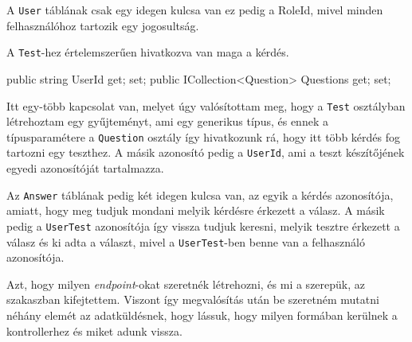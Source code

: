 A \texttt{User} táblának csak egy idegen kulcsa van ez pedig a RoleId, mivel minden felhasználóhoz tartozik egy jogosultság. \newline

A \texttt{Test}-hez értelemszerűen hivatkozva van maga a kérdés.
\begin{cpp}
public string UserId { get; set; }
public ICollection<Question> Questions { get; set; }
\end{cpp}
Itt egy-több kapcsolat van, melyet úgy valósítottam meg, hogy a \texttt{Test} osztályban létrehoztam egy gyűjteményt, ami egy generikus típus, és ennek a típusparamétere a \texttt{Question} osztály így hivatkozunk rá, hogy itt több kérdés fog tartozni egy teszthez. A másik azonosító pedig a \texttt{UserId}, ami a teszt készítőjének egyedi azonosítóját tartalmazza. \newline

Az \texttt{Answer} táblának pedig két idegen kulcsa van, az egyik a kérdés azonosítója, amiatt, hogy meg tudjuk mondani melyik kérdésre érkezett a válasz. A másik pedig a \texttt{UserTest} azonosítója így vissza tudjuk keresni,  melyik tesztre érkezett a válasz és ki adta a választ, mivel a \texttt{UserTest}-ben benne van a felhasználó azonosítója.


Azt, hogy milyen \textit{endpoint}-okat szeretnék létrehozni, és mi a szerepük, az  szakaszban kifejtettem. Viszont így megvalósítás után be szeretném mutatni néhány elemét az adatküldésnek, hogy lássuk, hogy milyen formában kerülnek a kontrollerhez és miket adunk vissza. 


